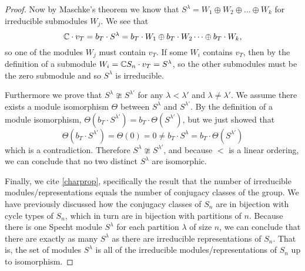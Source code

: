 \documentclass[12pt,twoside]{reedthesis}
\theoremstyle{plain}   %
\theoremstyle{definition}
\theoremstyle{remark}
\numberwithin{equation}{section}
\begin{document}
\begin{proof}
    Now by Maschke's theorem we know that $S^\lambda = W_1 \oplus W_2 \oplus \dots \oplus W_k$ for irreducible submodules $W_j$.
    We see that
    \[\mathbb{C} \cdot v_T = b_T \cdot S^\lambda = b_T \cdot W_1 \oplus b_T \cdot W_2 \dots \oplus b_T \cdot W_k,\]
    so one of the modules $W_j$ must contain $v_T$.
    If some $W_i$ contains $v_T$, then by the definition of a submodule $W_i = \mathbb{C}  S_n \cdot v_T = S^\lambda$, so
    the other submodules must be the zero submodule and so $S^\lambda$ is irreducible.
    \par
    Furthermore we prove that $S^\lambda  \ncong S^{\lambda'}$ for any $\lambda < \lambda'$ and $\lambda \neq \lambda'$.
    We assume there exists a module isomorphism $\Theta$ between $S^\lambda$ and $S^{\lambda'}$.
    By the definition of a module isomorphism, $\Theta(b_T \cdot S^{\lambda'}) = b_T \cdot \Theta( S^{\lambda'})$,
    but we just showed that
    \[\Theta(b_T \cdot S^{\lambda'}) = \Theta(0) = 0 \neq b_T \cdot S^\lambda = b_T \cdot \Theta( S^{\lambda'})\]
    which is a contradiction. Therefore $S^\lambda \ncong S^{\lambda'}$, and because $<$ is a linear ordering, we can conclude that
    no two distinct $S^\lambda$ are isomorphic. \par
    Finally, we cite \ref{charprop}, specifically the result that the number of irreducible modules/representations equals
    the number of conjugacy classes of the group. We have previously discussed how the conjugacy classes of $S_n$ are in bijection with cycle types of $S_n$,
    which in turn are in bijection with partitions of $n$.
    Because there is one Specht module $S^\lambda$ for each partition $\lambda$ of size $n$,
    we can conclude that there are exactly as many $S^\lambda$ as there are irreducible representations of $S_n$.
    That is, the set of modules $S^\lambda$ is all of the irreducible modules/representations of $S_n$ up to isomorphism.
  \end{proof}
\end{document}
